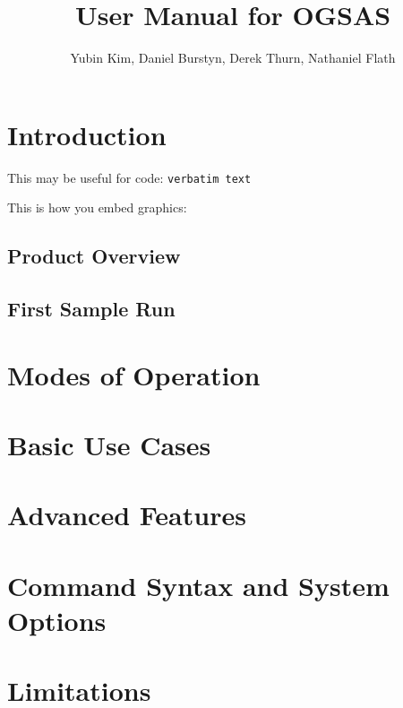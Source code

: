 \documentclass[titlepage]{article}
\title{User Manual for OGSAS}
\author{Yubin Kim, Daniel Burstyn, Derek Thurn, Nathaniel Flath}
\begin{document}
\maketitle
\newpage
\tableofcontents
\newpage

\section{Introduction}
This may be useful for code: \verb!verbatim text!

This is how you embed graphics:

\subsection{Product Overview}

\subsection{First Sample Run}

\section{Modes of Operation}

\section{Basic Use Cases}

\section{Advanced Features}

\section{Command Syntax and System Options}

\section{Limitations}
\end{document}
